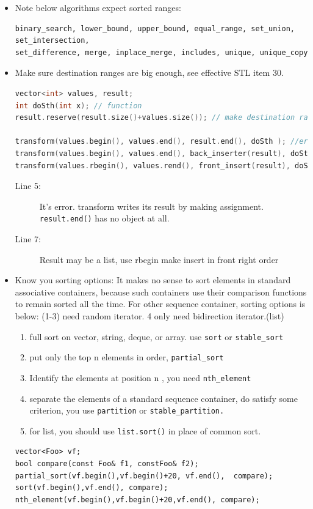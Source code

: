 \documentclass[a4paper,11pt,twoside]{book}
\begin{document}
\begin{itemize}
	\item Note below algorithms expect sorted ranges:
\begin{lstlisting}[numbers=none]
binary_search, lower_bound, upper_bound, equal_range, set_union, set_intersection,
set_difference, merge, inplace_merge, includes, unique, unique_copy
\end{lstlisting}

	\item Make sure destination ranges are big enough, see effective STL item 30.
\begin{lstlisting}[frame=single, language=c++]
vector<int> values, result;
int doSth(int x); // function
result.reserve(result.size()+values.size()); // make destination range big enough

transform(values.begin(), values.end(), result.end(), doSth ); //error 
transform(values.begin(), values.end(), back_inserter(result), doSth) //OK
transform(values.rbegin(), values.rend(), front_insert(result), doSth) //OK
\end{lstlisting}
\begin{description}
	\item[Line 5:] It's error. transform writes its result by making assignment. \texttt{result.end()} has no object at all.
	\item[Line 7:] Result may be a list, use rbegin make insert in front right order
\end{description}

	\item Know you sorting options: It makes no sense to sort elements in standard associative containers, because such containers use their comparison functions to remain sorted all the time. For other sequence container, sorting options is below: (1-3) need random iterator. 4 only need bidirection iterator.(list)
  \begin{enumerate}
  \item full sort on vector, string, deque, or array.  use \texttt{sort} or \texttt{stable\_sort}
  \item put only the top n elements in order, \texttt{partial\_sort}
  \item Identify the elements at position n , you need \texttt{nth\_element}
  \item separate the elements of a standard sequence container, do satisfy some criterion, you use \texttt{partition} or \texttt{stable\_partition.}
  \item for list, you should use \texttt{list.sort()} in place of common sort.
  \end{enumerate}
\begin{lstlisting}[numbers=none]
vector<Foo> vf;
bool compare(const Foo& f1, constFoo& f2);
partial_sort(vf.begin(),vf.begin()+20, vf.end(),  compare);
sort(vf.begin(),vf.end(), compare);
nth_element(vf.begin(),vf.begin()+20,vf.end(), compare);


\end{lstlisting}
\end{itemize}
\end{document}
